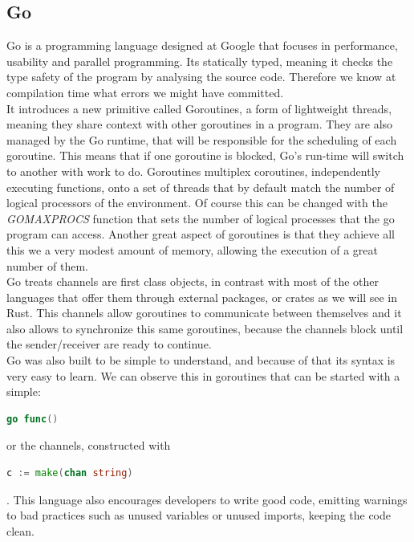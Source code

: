 \documentclass[runningheads]{llncs}
\begin{document}
\subsection{Go}
Go is a programming language designed at Google that focuses in performance, usability and parallel programming.
Its statically typed, meaning it checks the type safety of the program by analysing the source code. Therefore we know at compilation time what errors we might have committed.\\
It introduces a new primitive called Goroutines, a form of lightweight threads, meaning they share context with other goroutines in a program. They are also managed by the Go runtime, that will be responsible for the scheduling of each goroutine. This means that if one goroutine is blocked, Go's run-time will switch to another with work to do.
Goroutines multiplex coroutines, independently executing functions, onto a set of threads that by default match the number of logical processors of the environment. Of course this can be changed with the {\it GOMAXPROCS} function that sets the number of logical processes that the go program can access. Another great aspect of goroutines is that they achieve all this we a very modest amount of memory, allowing the execution of a great number of them.\\
Go treats channels are first class objects, in contrast with most of the other languages that offer them through external packages, or crates as we will see in Rust. This channels allow goroutines to communicate between themselves and it also allows to synchronize this same goroutines, because the channels block until the sender/receiver are ready to continue.\\	
Go was also built to be simple to understand, and because of that its syntax is very easy to learn. We can observe this in goroutines that can be started with a simple:
\begin{lstlisting}[language=Go]
go func()
\end{lstlisting} 
or the channels, constructed with
\begin{lstlisting}[language=Go]
c := make(chan string)
\end{lstlisting}.
This language also encourages developers to write good code, emitting warnings to bad practices such as unused variables or unused imports, keeping the code clean.
\end{document}
